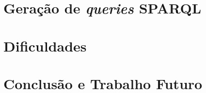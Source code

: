 \documentclass[tikz,runningheads,a4paper]{llncs}
\begin{document}
\section{Geração de \textit{queries} SPARQL}

\section{Dificuldades}



\section{Conclusão e Trabalho Futuro} \label{SecConclusion}

%
%
%
% 
% 
%

{}
\end{document}
